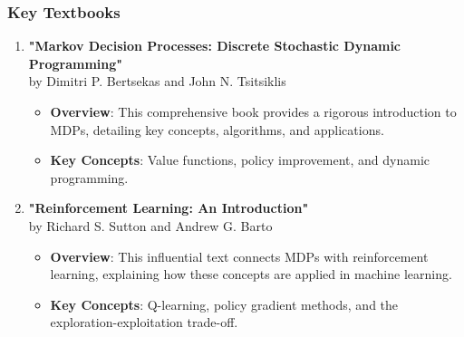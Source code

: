\documentclass[aspectratio=169]{beamer}
\begin{document}
\begin{frame}[fragile]
    \frametitle{Key Textbooks}
    \begin{enumerate}
        \item \textbf{"Markov Decision Processes: Discrete Stochastic Dynamic Programming"} \\
        by Dimitri P. Bertsekas and John N. Tsitsiklis
        \begin{itemize}
            \item \textbf{Overview}: This comprehensive book provides a rigorous introduction to MDPs, detailing key concepts, algorithms, and applications.
            \item \textbf{Key Concepts}: Value functions, policy improvement, and dynamic programming.
        \end{itemize}
        
        \item \textbf{"Reinforcement Learning: An Introduction"} \\
        by Richard S. Sutton and Andrew G. Barto
        \begin{itemize}
            \item \textbf{Overview}: This influential text connects MDPs with reinforcement learning, explaining how these concepts are applied in machine learning.
            \item \textbf{Key Concepts}: Q-learning, policy gradient methods, and the exploration-exploitation trade-off.
        \end{itemize}
    \end{enumerate}
\end{frame}
\end{document}
